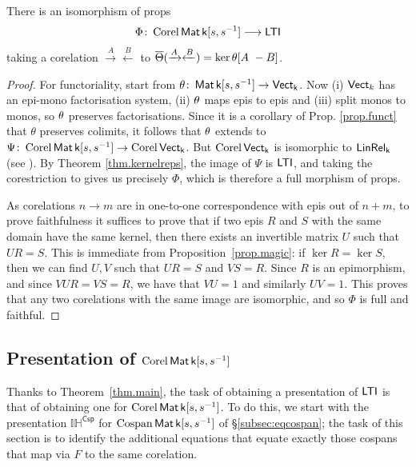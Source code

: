 \begin{theorem}\label{thm.main}
  There is an isomorphism of props 
  \[
    \Phi{\colon} \operatorname{{Corel}}\operatorname{\mathsf{Mat}}{\mathsf{k}[s,s^{-1}]} \longrightarrow \operatorname{\mathsf{LTI}}
  \]
  taking a corelation $\xrightarrow{A}\xleftarrow{B}$ 
  to $\overline{\Theta}(\xrightarrow{A}\xleftarrow{B}) = {\ker\theta [A \ -B]}$.
\end{theorem}
\begin{proof}
  For functoriality, start from $\theta{\colon}\operatorname{\mathsf{Mat}}{\mathsf{k}[s,s^{-1}]} \to
  \operatorname{\mathsf{Vect}}_{\mathsf{k}}$. Now (i) $\operatorname{\mathsf{Vect}}_k$ has an epi-mono factorisation system, (ii)
  $\theta$ maps epis to epis and (iii) split monos to monos, so $\theta$
  preserves factorisations. Since it is a corollary of Prop. \ref{prop.funct}
  that $\theta$ preserves colimits, it follows that $\theta$ extends to
   $\Psi{\colon}\operatorname{{Corel}}\operatorname{\mathsf{Mat}}{\mathsf{k}[s,s^{-1}]} \to \operatorname{{Corel}}\operatorname{\mathsf{Vect}}_{\mathsf{k}}$. But $\operatorname{{Corel}}\operatorname{\mathsf{Vect}}_{\mathsf{k}}$ is
  isomorphic to $\operatorname{\mathsf{LinRel}}_{\mathsf{k}}$ (see %
  \cite{Fo}).
  By Theorem \ref{thm.kernelreps}, the image of $\Psi$ is $\operatorname{\mathsf{LTI}}$, and taking
  the corestriction to gives us precisely $\Phi$, which is therefore a full
  morphism of props.

  As corelations $n \to m$ are in one-to-one correspondence with epis out of
  $n+m$, to prove faithfulness it suffices to prove that if two epis $R$ and $S$
  with the same domain have the same kernel, then there exists an invertible
  matrix $U$ such that $UR =S$. This is immediate from
  Proposition~\ref{prop.magic}: if $\ker R= \ker S$, then we can find $U, V$
  such that $UR = S$ and $VS = R$. Since $R$ is an epimorphism, and since $VUR =
  VS = R$, we have that $VU=1$ and similarly $UV =1$. This proves that any two
  corelations with the same image are isomorphic, and so $\Phi$ is full and
  faithful.  
\end{proof}


\subsection{Presentation of $\operatorname{{Corel}}\operatorname{\mathsf{Mat}}{\mathsf{k}[s,s^{-1}]}$}


Thanks to Theorem~\ref{thm.main}, the task of obtaining a presentation of $\operatorname{\mathsf{LTI}}$
is that of obtaining one for $\operatorname{{Corel}}\operatorname{\mathsf{Mat}}{\mathsf{k}[s,s^{-1}]}$. 
%
To do this, we start with the presentation
$\mathbb{IH}^{\textsf{Csp}}$ for $\operatorname{{Cospan}}\operatorname{\mathsf{Mat}}{\mathsf{k}[s,s^{-1}]}$ of \S\ref{subsec:eqcospan}; the task of
this section is to identify the additional equations that equate
exactly those cospans that map via $F$ to the same corelation.

